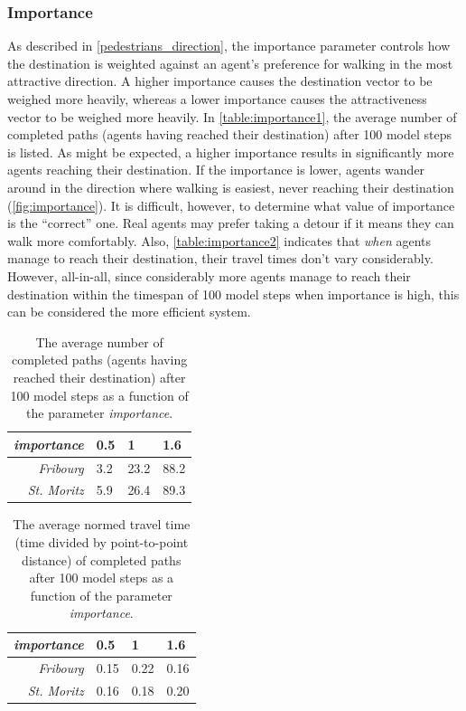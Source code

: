 \documentclass[a4paper, DIV11, abstracton]{scrartcl}
\begin{document}
\subsubsection{Importance}
As described in \autoref{pedestrians_direction}, the importance parameter controls how the destination is weighted against an agent's preference for walking in the most attractive direction. A higher importance causes the destination vector to be weighed more heavily, whereas a lower importance causes the attractiveness vector to be weighed more heavily. In \autoref{table:importance1}, the average number of completed paths (agents having reached their destination) after 100 model steps is listed. As might be expected, a higher importance results in significantly more agents reaching their destination. If the importance is lower, agents wander around in the direction where walking is easiest, never reaching their destination (\autoref{fig:importance}). It is difficult, however, to determine what value of importance is the ``correct'' one. Real agents may prefer taking a detour if it means they can walk more comfortably. Also, \autoref{table:importance2} indicates that \emph{when} agents manage to reach their destination, their travel times don't vary considerably. However, all-in-all, since considerably more agents manage to reach their destination within the timespan of 100 model steps when importance is high, this can be considered the more efficient system.

\begin{table}[htbp]
\begin{center}
 \setlength{\abovecaptionskip}{0pt}
 \setlength{\belowcaptionskip}{10pt}
\caption{The average number of completed paths (agents having reached their destination) after 100 model steps as a function of the parameter \emph{importance}.}
\begin{tabular}{r l l l}
  \hline
  \emph{importance} & 0.5 & 1 & 1.6 \\ \hline
  \emph{Fribourg} & 3.2 & 23.2 & 88.2  \\ 
  \emph{St. Moritz} & 5.9 & 26.4 & 89.3  \\
\hline
\end{tabular}
\label{table:importance1}
\end{center}
\end{table}

\begin{table}[htbp]
\begin{center}
 \setlength{\abovecaptionskip}{0pt}
 \setlength{\belowcaptionskip}{10pt}
\caption{The average normed travel time (time divided by point-to-point distance) of completed paths after 100 model steps as a function of the parameter \emph{importance}.}
\begin{tabular}{r l l l}
  \hline
  \emph{importance} & 0.5 & 1 & 1.6 \\ \hline
  \emph{Fribourg} & 0.15 & 0.22 & 0.16  \\ 
  \emph{St. Moritz} & 0.16 & 0.18 & 0.20  \\
\hline
\end{tabular}
\label{table:importance2}
\end{center}
\end{table}
\end{document}
